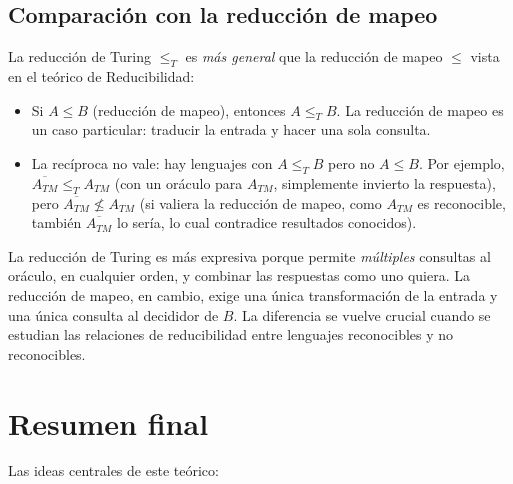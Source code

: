 \documentclass[11pt,a4paper]{article}
\theoremstyle{definicion}
\begin{document}
\subsection{Comparación con la reducción de mapeo}

La reducción de Turing $\leq_T$ es \emph{más general} que la reducción de mapeo $\leq$ vista en el teórico de Reducibilidad:

\begin{itemize}
    \item Si $A \leq B$ (reducción de mapeo), entonces $A \leq_T B$. La reducción de mapeo es un caso particular: traducir la entrada y hacer una sola consulta.
    \item La recíproca no vale: hay lenguajes con $A \leq_T B$ pero no $A \leq B$. Por ejemplo, $\overline{A_{TM}} \leq_T A_{TM}$ (con un oráculo para $A_{TM}$, simplemente invierto la respuesta), pero $\overline{A_{TM}} \not\leq A_{TM}$ (si valiera la reducción de mapeo, como $A_{TM}$ es reconocible, también $\overline{A_{TM}}$ lo sería, lo cual contradice resultados conocidos).
\end{itemize}

\begin{idea}
La reducción de Turing es más expresiva porque permite \emph{múltiples} consultas al oráculo, en cualquier orden, y combinar las respuestas como uno quiera. La reducción de mapeo, en cambio, exige una única transformación de la entrada y una única consulta al decididor de $B$. La diferencia se vuelve crucial cuando se estudian las relaciones de reducibilidad entre lenguajes reconocibles y no reconocibles.
\end{idea}

\section{Resumen final}

Las ideas centrales de este teórico:
\end{document}
